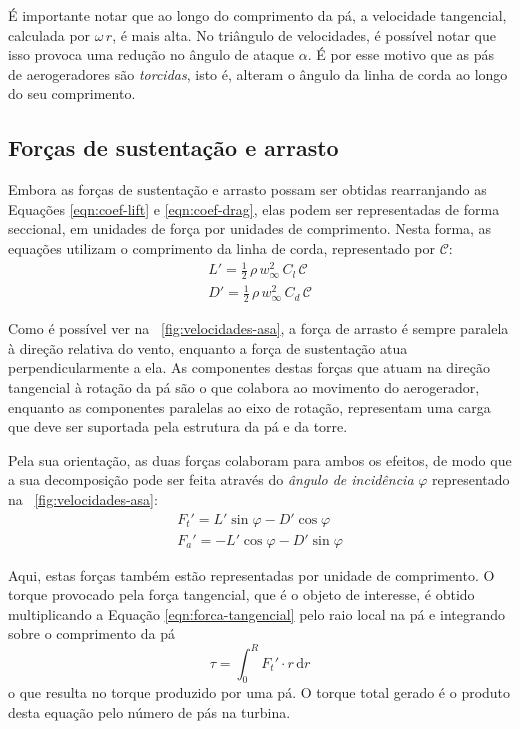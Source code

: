 \documentclass{article}
\begin{document}
	É importante notar que ao longo do comprimento da pá, a velocidade tangencial, calculada por $\omega\,r$, é mais alta.
	No triângulo de velocidades, é possível notar que isso provoca uma redução no ângulo de ataque $\alpha$.
	É por esse motivo que as pás de aerogeradores são \emph{torcidas}, isto é, alteram o ângulo da linha de corda ao longo do seu comprimento.

	\subsection{Forças de sustentação e arrasto}
	Embora as forças de sustentação e arrasto possam ser obtidas rearranjando as Equações \ref{eqn:coef-lift} e \ref{eqn:coef-drag}, elas podem ser representadas de forma seccional, em unidades de força por unidades de comprimento.
	Nesta forma, as equações utilizam o comprimento da linha de corda, representado por $\mathcal{C}$:
	\begin{align}
		L' = \frac{1}{2}\,\rho\,w_\infty^2\,C_l\,\mathcal{C} \\
		D' = \frac{1}{2}\,\rho\,w_\infty^2\,C_d\,\mathcal{C}
	\end{align}

	Como é possível ver na \figurename\ \ref{fig:velocidades-asa}, a força de arrasto é sempre paralela à direção relativa do vento,
	enquanto a força de sustentação atua perpendicularmente a ela.
	As componentes destas forças que atuam na direção tangencial à rotação da pá são o que colabora ao movimento do aerogerador,
	enquanto as componentes paralelas ao eixo de rotação, representam uma carga que deve ser suportada pela estrutura da pá e da torre.

	Pela sua orientação, as duas forças colaboram para ambos os efeitos, de modo que a sua decomposição pode ser feita através do
	\emph{ângulo de incidência} $\varphi$ representado na \figurename\ \ref{fig:velocidades-asa}:
	\begin{align}
		F_t' = L'\sin\varphi - D'\cos\varphi \label{eqn:forca-tangencial}\\
		F_a' = - L'\cos\varphi - D'\sin\varphi \label{eqn:forca-axial}
	\end{align}

	Aqui, estas forças também estão representadas por unidade de comprimento.
	O torque provocado pela força tangencial, que é o objeto de interesse, é obtido multiplicando a Equação \ref{eqn:forca-tangencial} 
	pelo raio local na pá e integrando sobre o comprimento da pá
	\begin{equation}
		\tau = \int_0^R F_t' \cdot r\,\mathrm{d}r
	\end{equation}
	o que resulta no torque produzido por uma pá.
	O torque total gerado é o produto desta equação pelo número de pás na turbina.
\end{document}
